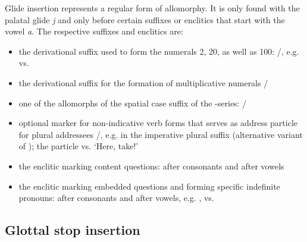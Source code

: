 Glide insertion represents a regular form of allomorphy. It is only found with the palatal glide \textit{j} and only before certain suffixes or enclitics that start with the vowel \textit{a}. The respective suffixes and enclitics are:
%
\begin{itemize}
	\item	the derivational suffix used to form the numerals 2, 20, as well as 100: \slash{}, e.g.   vs.   
	\item	the derivational suffix  for the formation of multiplicative numerals \slash{} 
	\item	one of the allomorphs of the spatial case suffix of the -series: \slash{} 
	\item	optional marker for non-indicative verb forms that  serves as address particle for plural addressees \slash{}, e.g. in the imperative plural suffix  (alternative variant of ); the particle  vs.  `Here, take!'
	\item	the enclitic marking content questions:  after consonants and  after vowels 
	\item	the enclitic marking embedded questions and forming specific indefinite pronouns:  after consonants and  after vowels, e.g.  , 	 vs.   
\end{itemize}



\subsection{Glottal stop insertion}
\label{ssec:Glottal stop insertion}

